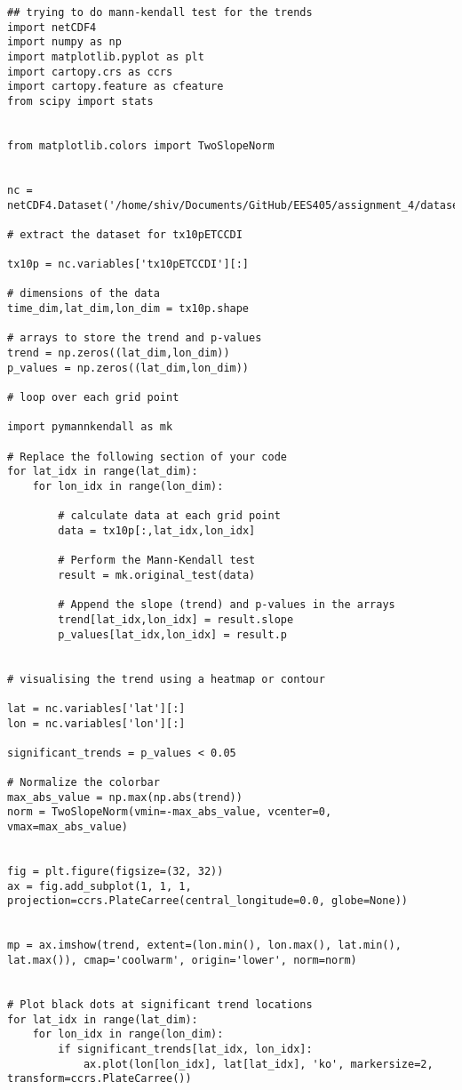 \documentclass[a4paper, 12pt, twoside]{report}
\begin{document}
\begin{lstlisting}
## trying to do mann-kendall test for the trends 
import netCDF4
import numpy as np
import matplotlib.pyplot as plt
import cartopy.crs as ccrs
import cartopy.feature as cfeature
from scipy import stats


from matplotlib.colors import TwoSlopeNorm


nc = netCDF4.Dataset('/home/shiv/Documents/GitHub/EES405/assignment_4/datasets/tx10p.india.future.nc')

# extract the dataset for tx10pETCCDI

tx10p = nc.variables['tx10pETCCDI'][:] 

# dimensions of the data
time_dim,lat_dim,lon_dim = tx10p.shape

# arrays to store the trend and p-values
trend = np.zeros((lat_dim,lon_dim))
p_values = np.zeros((lat_dim,lon_dim))

# loop over each grid point 

import pymannkendall as mk

# Replace the following section of your code
for lat_idx in range(lat_dim):
    for lon_idx in range(lon_dim):
        
        # calculate data at each grid point
        data = tx10p[:,lat_idx,lon_idx]
        
        # Perform the Mann-Kendall test
        result = mk.original_test(data)
        
        # Append the slope (trend) and p-values in the arrays
        trend[lat_idx,lon_idx] = result.slope
        p_values[lat_idx,lon_idx] = result.p

        
# visualising the trend using a heatmap or contour 

lat = nc.variables['lat'][:]
lon = nc.variables['lon'][:]

significant_trends = p_values < 0.05

# Normalize the colorbar
max_abs_value = np.max(np.abs(trend))
norm = TwoSlopeNorm(vmin=-max_abs_value, vcenter=0, vmax=max_abs_value)


fig = plt.figure(figsize=(32, 32))
ax = fig.add_subplot(1, 1, 1, projection=ccrs.PlateCarree(central_longitude=0.0, globe=None))


mp = ax.imshow(trend, extent=(lon.min(), lon.max(), lat.min(), lat.max()), cmap='coolwarm', origin='lower', norm=norm)


# Plot black dots at significant trend locations
for lat_idx in range(lat_dim):
    for lon_idx in range(lon_dim):
        if significant_trends[lat_idx, lon_idx]:
            ax.plot(lon[lon_idx], lat[lat_idx], 'ko', markersize=2, transform=ccrs.PlateCarree())


\end{lstlisting}
\end{document}
